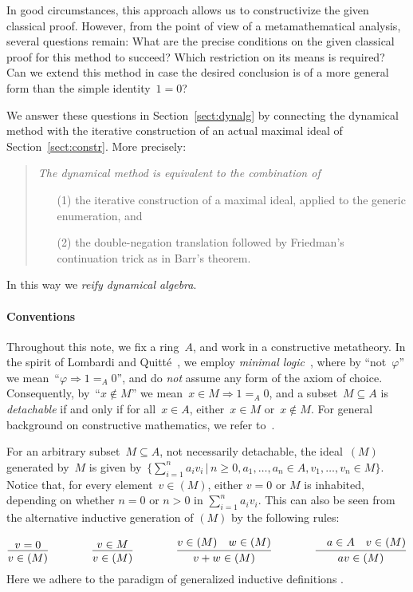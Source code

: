 \documentclass[com,11pt,crcready]{iosart2x}
\theoremstyle{definition}
\theoremstyle{plain}
\theoremstyle{remark}
\renewcommand{\_}{\mathpunct{.}\,}
\begin{document}
In good circumstances, this approach allows us to constructivize the given
classical proof. However, from the point of view of a metamathematical
analysis, several questions remain: What are the precise conditions on the
given classical proof for this method to succeed? Which restriction on its
means is required?
Can we extend this method in
case the desired conclusion is of a more general form than the simple
identity~$1 = 0$?

We answer these questions in Section~\ref{sect:dynalg} by connecting the
dynamical method with the iterative construction of an actual maximal ideal of
Section~\ref{sect:constr}. More precisely:
\begin{quote}\it The dynamical method is equivalent to the
combination of
\begin{enumerate}
\item[(1)] the iterative construction of a maximal ideal, applied to the
generic enumeration, and
\item[(2)] the double-negation translation followed by Friedman's continuation
trick as in Barr's theorem.
\end{enumerate}
\end{quote}
In this way we \emph{reify dynamical algebra}.


\paragraph{Conventions} Throughout this note, we fix a ring~$A$, and work in a constructive metatheory.
In the spirit of Lombardi and Quitté~\cite{lombardi-quitte:constructive-algebra}, we employ \emph{minimal
logic}~\cite{johansson:minimal}, where by ``not~$\varphi$'' we mean~``$\varphi \Rightarrow 1 =_A 0$'', and do \emph{not} assume any form of the axiom of choice. Consequently,
by~``$x \not\in M$'' we mean~$x \in M \Rightarrow 1 =_A 0$, and a subset~$M
\subseteq A$ is \emph{detachable} if and only if for all~$x \in A$, either~$x \in M$
or~$x \not\in M$. For general background on constructive mathematics, we refer
to~\cite{bauer:five-stages,bauer:int-mathematics,sep:constructive-mathematics}.

For an arbitrary subset~$M \subseteq A$, not necessarily
detachable, the ideal~$(M)$ generated by~$M$ is given by~$\bigl\{ \sum_{i=1}^n
a_i v_i \,\Big|\, n \geq 0, a_1,\ldots,a_n \in A, v_1,\ldots,v_n \in M \bigr\}$.
Notice that, for every element~$v \in (M)$, either $v = 0$ or $M$ is inhabited, depending on whether
$n=0$ or $n>0$ in $\sum_{i=1}^n a_i v_i$. This can also be seen from the alternative inductive
generation of $(M)$ by the following rules:\par
{\vspace*{-0.8em}\small\[
\infer{v \in (M)}{v=0}
\qquad\qquad
\infer{v \in (M)}{v \in M}
\qquad\qquad
\infer{v+w \in (M)}{v \in (M)\quad w \in (M)}
\qquad\qquad
\infer{av \in (M)}{\quad a\in A \quad v \in (M)}
\]}%
\noindent Here we adhere to the paradigm of generalized inductive definitions
\cite{aczel-rathjen:notes,aczel-rathjen:cstdraft,rathjen:genind}.
\end{document}
